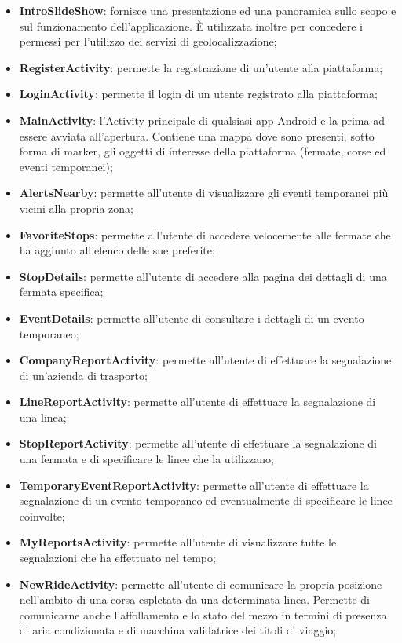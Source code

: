             \begin{itemize}
                \item \textbf{IntroSlideShow}: fornisce una presentazione ed una panoramica sullo scopo e sul funzionamento dell'applicazione. È utilizzata inoltre per concedere i permessi per l'utilizzo dei servizi di geolocalizzazione;
                \item \textbf{RegisterActivity}: permette la registrazione di un'utente alla piattaforma;
                \item \textbf{LoginActivity}: permette il login di un utente registrato alla piattaforma;
                \item \textbf{MainActivity}: l'Activity principale di qualsiasi app Android e la prima ad essere avviata all'apertura. Contiene una mappa dove sono presenti, sotto forma di marker, gli oggetti di interesse della piattaforma (fermate, corse ed eventi temporanei);
                \item \textbf{AlertsNearby}: permette all'utente di visualizzare gli eventi temporanei più vicini alla propria zona;
                \item \textbf{FavoriteStops}: permette all'utente di accedere velocemente alle fermate che ha aggiunto all'elenco delle sue preferite;
                \item \textbf{StopDetails}: permette all'utente di accedere alla pagina dei dettagli di una fermata specifica;
                \item \textbf{EventDetails}: permette all'utente di consultare i dettagli di un evento temporaneo;
                \item \textbf{CompanyReportActivity}: permette all'utente di effettuare la segnalazione di un'azienda di trasporto;
                \item \textbf{LineReportActivity}: permette all'utente di effettuare la segnalazione di una linea;
                \item \textbf{StopReportActivity}: permette all'utente di effettuare la segnalazione di una fermata e di specificare le linee che la utilizzano;
                \item \textbf{TemporaryEventReportActivity}: permette all'utente di effettuare la segnalazione di un evento temporaneo ed eventualmente di specificare le linee coinvolte;
                \item \textbf{MyReportsActivity}: permette all'utente di visualizzare tutte le segnalazioni che ha effettuato nel tempo;
                \item \textbf{NewRideActivity}: permette all'utente di comunicare la propria posizione nell'ambito di una corsa espletata da una determinata linea. Permette di comunicarne anche l'affollamento e lo stato del mezzo in termini di presenza di aria condizionata e di macchina validatrice dei titoli di viaggio;

\end{itemize}
